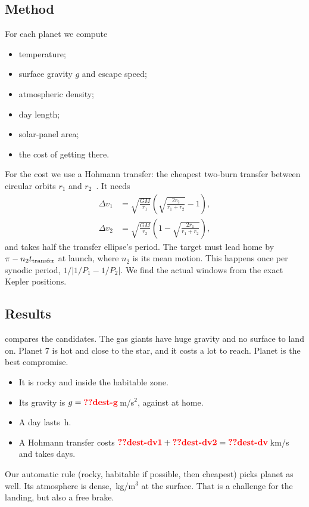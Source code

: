 \documentclass[aps,prd,twocolumn,nofootinbib,floatfix,superscriptaddress]{revtex4-2}
\begin{document}
\subsection{Method}
For each planet we compute
\begin{itemize}
\item temperature;
\item surface gravity $g$ and escape speed;
\item atmospheric density;
\item day length;
\item solar-panel area;
\item the cost of getting there.
\end{itemize}
For the cost we use a Hohmann transfer: the cheapest two-burn transfer between circular orbits $r_1$ and $r_2$~\cite{curtis2014}.
It needs
\begin{align}
  \Delta v_1 &= \sqrt{\frac{GM}{r_1}}\left(\sqrt{\frac{2r_2}{r_1+r_2}}-1\right),\\
  \Delta v_2 &= \sqrt{\frac{GM}{r_2}}\left(1-\sqrt{\frac{2r_1}{r_1+r_2}}\right),
\end{align}
and takes half the transfer ellipse's period.
The target must lead home by $\pi-n_2t_{\rm transfer}$ at launch, where $n_2$ is its mean motion.
This happens once per synodic period, $1/|1/P_1-1/P_2|$.
We find the actual windows from the exact Kepler positions.

\subsection{Results}
 compares the candidates.
The gas giants have huge gravity and no surface to land on.
Planet 7 is hot and close to the star, and it costs a lot to reach.
Planet  is the best compromise.
\begin{itemize}
\item It is rocky and inside the habitable zone.
\item Its gravity is $g=\val{dest-g}$\,m/s$^2$, against  at home.
\item A day lasts \,h.
\item A Hohmann transfer costs $\val{dest-dv1}+\val{dest-dv2}=\val{dest-dv}$\,km/s and takes  days.
\end{itemize}
Our automatic rule (rocky, habitable if possible, then cheapest) picks planet  as well.
Its atmosphere is dense, \,kg/m$^3$ at the surface.
That is a challenge for the landing, but also a free brake.
\end{document}

